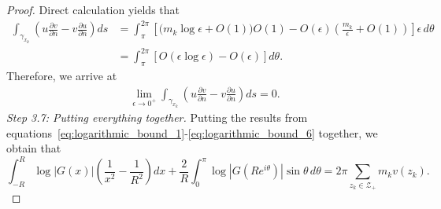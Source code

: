\documentclass[11pt,twoside]{article} %
\begin{document}
\begin{proof}
Direct calculation yields that
\begin{align*}
\int_{\gamma_{x_k}} \left( u \frac{\partial v}{\partial n} - v \frac{\partial u}{\partial n} \right) ds & = \int_\pi^{2\pi} \left[ \Big(m_k\log\epsilon + O(1)\Big)O(1) - O(\epsilon)\left(\frac{m_k}{\epsilon} + O(1)\right) \right] \epsilon \, d\theta \\
& = \int_\pi^{2\pi} \left[ O(\epsilon \log\epsilon) - O(\epsilon) \right] d\theta.
\end{align*}
Therefore, we arrive at
\begin{align}
\lim_{\epsilon \to 0^+} \int_{\gamma_{x_k}} \left( u \frac{\partial v}{\partial n} - v \frac{\partial u}{\partial n} \right) ds = 0. \label{eq:logarithmic_bound_6}
\end{align}
\emph{Step 3.7: Putting everything together. } Putting the results from equations~\eqref{eq:logarithmic_bound_1}-\eqref{eq:logarithmic_bound_6} together, we obtain that
$$\int_{-R}^R \log|G(x)| \left(\frac{1}{x^2} - \frac{1}{R^2}\right) dx + \frac{2}{R} \int_0^\pi \log|G(Re^{i\theta})| \sin\theta \, d\theta = 2\pi \sum_{z_k \in \mathcal{Z}_{+}} m_k v(z_k).$$ 






\end{proof}
\end{document}
